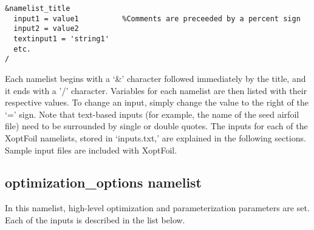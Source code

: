 \documentclass[11pt]{article}
\begin{document}
\begin{verbatim}
&namelist_title
  input1 = value1          %Comments are preceeded by a percent sign
  input2 = value2
  textinput1 = 'string1'
  etc.
/
\end{verbatim}

Each namelist begins with a `\&' character followed immediately by the title, and it ends with 
a '/' character.  Variables for each namelist are then listed with their respective
values.  To change an input, simply change the value to the right of the `=' sign.  Note
that text-based inputs (for example, the name of the seed airfoil file) need to be
surrounded by single or double quotes.  The inputs for each of the XoptFoil namelists,
stored in `inputs.txt,' are explained in the following sections. Sample input files are
included with XoptFoil.

\subsection{optimization\_options namelist}

In this namelist, high-level optimization and parameterization parameters are set.  Each
of the inputs is described in the list below.
\end{document}
